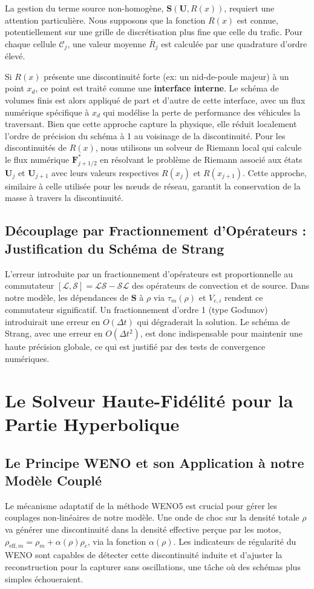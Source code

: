 La gestion du terme source non-homogène, $\mathbf{S}(\mathbf{U}, R(x))$, requiert une attention particulière. Nous supposons que la fonction $R(x)$ est connue, potentiellement sur une grille de discrétisation plus fine que celle du trafic. Pour chaque cellule $\mathcal{C}_j$, une valeur moyenne $\bar{R}_j$ est calculée par une quadrature d'ordre élevé.

Si $R(x)$ présente une discontinuité forte (ex: un nid-de-poule majeur) à un point $x_d$, ce point est traité comme une \textbf{interface interne}. Le schéma de volumes finis est alors appliqué de part et d'autre de cette interface, avec un flux numérique spécifique à $x_d$ qui modélise la perte de performance des véhicules la traversant. Bien que cette approche capture la physique, elle réduit localement l'ordre de précision du schéma à 1 au voisinage de la discontinuité.
Pour les discontinuités de $R(x)$, nous utilisons un solveur de Riemann local qui calcule le flux numérique $\mathbf{F}^*_{j+1/2}$ en résolvant le problème de Riemann associé aux états $\mathbf{U}_j$ et $\mathbf{U}_{j+1}$ avec leurs valeurs respectives $R(x_j)$ et $R(x_{j+1})$. Cette approche, similaire à celle utilisée pour les nœuds de réseau, garantit la conservation de la masse à travers la discontinuité.

\subsection{Découplage par Fractionnement d'Opérateurs : Justification du Schéma de Strang}
L'erreur introduite par un fractionnement d'opérateurs est proportionnelle au commutateur $[\mathcal{L}, \mathcal{S}] = \mathcal{L}\mathcal{S} - \mathcal{S}\mathcal{L}$ des opérateurs de convection et de source. Dans notre modèle, les dépendances de $\mathbf{S}$ à $\rho$ via $\tau_m(\rho)$ et $V_{e,i}$ rendent ce commutateur significatif. Un fractionnement d'ordre 1 (type Godunov) introduirait une erreur en $O(\Delta t)$ qui dégraderait la solution. Le schéma de Strang, avec une erreur en $O(\Delta t^2)$, est donc indispensable pour maintenir une haute précision globale, ce qui est justifié par des tests de convergence numériques.

\section{Le Solveur Haute-Fidélité pour la Partie Hyperbolique}

\subsection{Le Principe WENO et son Application à notre Modèle Couplé}
Le mécanisme adaptatif de la méthode WENO5 est crucial pour gérer les couplages non-linéaires de notre modèle. Une onde de choc sur la densité totale $\rho$ va générer une discontinuité dans la densité effective perçue par les motos, $\rho_{\text{eff},m} = \rho_m + \alpha(\rho) \rho_c$, via la fonction $\alpha(\rho)$. Les indicateurs de régularité du WENO sont capables de détecter cette discontinuité induite et d'ajuster la reconstruction pour la capturer sans oscillations, une tâche où des schémas plus simples échoueraient.

